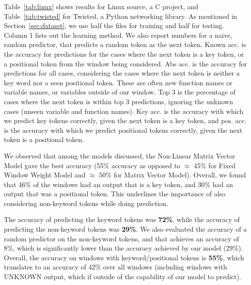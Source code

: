\noindent
Table~\ref{tab:linux} shows results for Linux source, a C project, and
Table~\ref{tab:twisted} for Twisted, a Python networking library. As mentioned
in Section~\ref{sec:dataset}, we use half the files for training and half for
testing.
Column 1
lists out the learning method. We also report numbers for a naive, random
predictor, that predicts a random token as the next token. Known acc. is the
accuracy for predictions for the cases where the next token is a key token, or
a positional token from the window being considered. Abs acc. is the accuracy
for predictions for all cases, considering the cases where the next token is
neither a key word nor a seen positional token. These are often new function
names or variable names, or variables outside of our window. Top 3 is the
percentage of cases where the next token is within top 3 predictions, ignoring
the unknown cases (unseen variable and function names). Key acc. is the
accuracy with which we predict key tokens correctly, given the next token is a
key token,
and pos. acc. is the accuracy with which we predict positional tokens
correctly, given the next token is a positional token.

We observed that among the models discussed, the Non-Linear Matrix Vector Model
gave the best accuracy (55\% accuracy as opposed to $\approx$ 45\% for Fixed
Window Weight Model and $\approx$ 50\% for Matrix Vector Model). Overall, we
found that 46\% of the windows had an output that is a key token, and 30\% had
an output that was a positional token. This underlines the importance of also
considering non-keyword tokens while doing prediction.

The accuracy of predicting the keyword tokens was {\bf 72\%}, while the accuracy
of predicting the non-keyword tokens was {\bf 29\%}. We also evaluated the
accuracy of a random predictor on the non-keyword tokens, and that achieves an
accuracy of 8\%, which is significantly lower than the accuracy achieved by our
model (29\%). Overall, the accuracy on windows with keyword/positional tokens is
{\bf 55\%}, which translates to an accuracy of 42\% over all windows (including
windows with UNKNOWN output, which if outside of the capability of our model to
predict).

